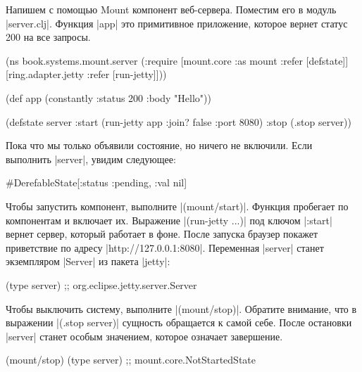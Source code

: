 Напишем с помощью Mount компонент веб-сервера. Поместим его в модуль
\spverb|server.clj|. Функция \spverb|app| это примитивное приложение, которое
вернет статус 200 на все запросы.

\begin{english}
  \begin{clojure}
(ns book.systems.mount.server
  (:require
   [mount.core :as mount :refer [defstate]]
   [ring.adapter.jetty :refer [run-jetty]]))

(def app (constantly {:status 200 :body "Hello"}))

(defstate server
  :start (run-jetty app {:join? false :port 8080})
  :stop (.stop server))
  \end{clojure}
\end{english}

Пока что мы только объявили состояние, но ничего не включили. Если выполнить
\spverb|server|, увидим следующее:

\begin{english}
  \begin{clojure}
#DerefableState[{:status :pending, :val nil}]
  \end{clojure}
\end{english}

Чтобы запустить компонент, выполните \spverb|(mount/start)|. Функция пробегает
по компонентам и включает их. Выражение \spverb|(run-jetty ...)| под ключом
\spverb|:start| вернет сервер, который работает в фоне. После запуска браузер
покажет приветствие по адресу \spverb|http://127.0.0.1:8080|. Переменная
\spverb|server| станет экземпляром \spverb|Server| из пакета \spverb|jetty|:

\begin{english}
  \begin{clojure}
(type server)
;; org.eclipse.jetty.server.Server
  \end{clojure}
\end{english}

Чтобы выключить систему, выполните \spverb|(mount/stop)|. Обратите внимание, что
в выражении \spverb|(.stop server)| сущность обращается к самой себе. После
остановки \spverb|server| станет особым значением, которое означает завершение.

\begin{english}
  \begin{clojure}
(mount/stop)
(type server)
;; mount.core.NotStartedState
  \end{clojure}
\end{english}

